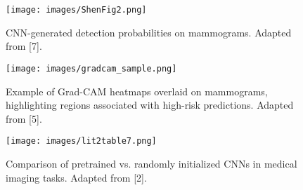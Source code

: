 \documentclass[12pt]{article}
\begin{document}
\begin{figure}[H]
    \centering
    \texttt{[image: images/ShenFig2.png]}
    \caption{CNN-generated detection probabilities on mammograms. Adapted from [7].}
    \label{fig:shen2019}
\end{figure}


\begin{figure}[H]
    \centering
    \texttt{[image: images/gradcam\_sample.png]}
    \caption{Example of Grad-CAM heatmaps overlaid on mammograms, highlighting regions associated with high-risk predictions. Adapted from [5].}
    \label{fig:gradcam}
\end{figure}

\begin{figure}[H]
    \centering
    \texttt{[image: images/lit2table7.png]}
    \caption{Comparison of pretrained vs. randomly initialized CNNs in medical imaging tasks. Adapted from [2].}
    \label{fig:lit2table7}
\end{figure}

\newpage
\end{document}
